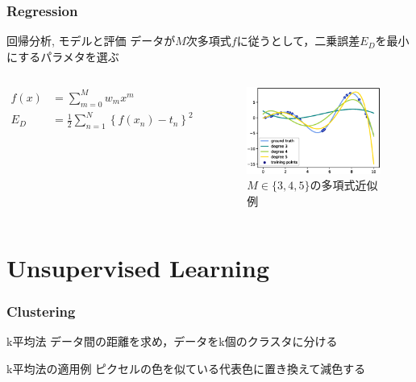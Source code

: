 \documentclass[dvipdfmx,platex]{beamer}
\begin{document}
\section{Regression}
\begin{frame}{回帰分析, モデルと評価}
  データが$M$次多項式$f$に従うとして，二乗誤差$E_D$を最小にするパラメタを選ぶ
  \begin{columns}[T,onlytextwidth]
    \begin{align*}
      f(x)&=\sum_{m=0}^{M}w_mx^{m}\\
      E_{D}&=\frac{1}{2}\sum_{n=1}^{N}{\left\{f(x_n)-t_n\right\}}^2
    \end{align*}
    \begin{figure}
      \centering
      \includegraphics[width=5cm]{fig/polyreg.eps}
      \caption{$M\in\{3,4,5\}${\mgfamily の多項式近似例}}
    \end{figure}
  \end{columns}
\end{frame}
\part{Unsupervised Learning}
\section{Clustering}
\begin{frame}{k平均法}
  データ間の距離を求め，データをk個のクラスタに分ける
\end{frame}
\begin{frame}{k平均法の適用例}
  ピクセルの色を似ている代表色に置き換えて減色する
\end{frame}
\end{document}
